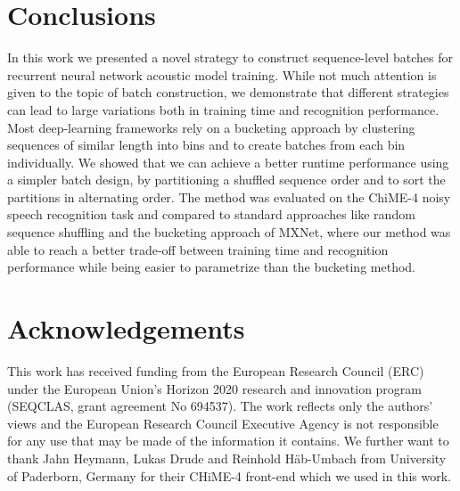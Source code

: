 \documentclass{article}
\begin{document}
      
  \section{Conclusions}
    In this work we presented a novel strategy to construct sequence-level batches for recurrent 
    neural network acoustic model training. While not much attention is given to the topic 
    of batch construction, we demonstrate that different strategies can lead to large variations 
    both in training time and recognition performance. Most deep-learning frameworks rely on a bucketing approach by clustering sequences of similar length into bins and to create batches from each bin individually. We showed that we can achieve a better runtime performance using a simpler batch design, by partitioning a shuffled sequence order and to sort the partitions in alternating order. The method was evaluated on the ChiME-4 noisy speech recognition task and 
    compared to standard approaches like random sequence shuffling and the bucketing approach of MXNet,
    where our method was able to reach a better trade-off between training time and recognition performance while being easier to parametrize than the bucketing method.
    

   \section{Acknowledgements}
 
   This work has received funding from the European Research Council
   (ERC) under the European Union’s Horizon 2020 research and innovation
   program (SEQCLAS, grant agreement No 694537).  The work reflects
   only the authors' views and the European Research Council Executive
   Agency is not responsible for any use that may be made of the
   information it contains.  We further want to thank Jahn Heymann, Lukas
   Drude and Reinhold H\"ab-Umbach from University of Paderborn, Germany
   for their CHiME-4 front-end which we used in this work.
   
   \ninept
   
   
\end{document}

